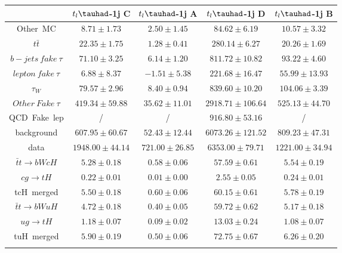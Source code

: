 \centering
\begin{tabular}{ccccc} \toprule\toprule
 & $t_{l}\tauhad$-1j C & $t_{l}\tauhad$-1j A & $t_{l}\tauhad$-1j D & $t_{l}\tauhad$-1j B\\\midrule
Other~MC & $8.71\pm1.73$ & $2.50\pm1.45$ & $84.62\pm6.19$ & $10.57\pm3.32$\\
$t\bar{t}$ & $22.35\pm1.75$ & $1.28\pm0.41$ & $280.14\pm6.27$ & $20.26\pm1.69$\\
$b-jets~fake~\tau$ & $71.10\pm3.25$ & $6.14\pm1.20$ & $811.72\pm10.82$ & $93.22\pm4.60$\\
$lepton~fake~\tau$ & $6.88\pm8.37$ & $-1.51\pm5.38$ & $221.68\pm16.47$ & $55.99\pm13.93$\\
$\tau_{W}$ & $79.57\pm2.96$ & $8.40\pm0.94$ & $839.60\pm10.20$ & $104.06\pm3.39$\\
$Other~Fake~\tau$ & $419.34\pm59.88$ & $35.62\pm11.01$ & $2918.71\pm106.64$ & $525.13\pm44.70$\\
QCD~Fake~lep &  / &  / & $916.80\pm53.16$ &  /\\
background & $607.95\pm60.67$ & $52.43\pm12.44$ & $6073.26\pm121.52$ & $809.23\pm47.31$\\
data & $1948.00\pm44.14$ & $721.00\pm26.85$ & $6353.00\pm79.71$ & $1221.00\pm34.94$\\
$\bar{t}t\to bWcH$ & $5.28\pm0.18$ & $0.58\pm0.06$ & $57.59\pm0.61$ & $5.54\pm0.19$\\
$cg\to tH$ & $0.22\pm0.01$ & $0.01\pm0.00$ & $2.55\pm0.05$ & $0.24\pm0.01$\\
tcH~merged & $5.50\pm0.18$ & $0.60\pm0.06$ & $60.15\pm0.61$ & $5.78\pm0.19$\\
$\bar{t}t\to bWuH$ & $4.72\pm0.18$ & $0.40\pm0.05$ & $59.72\pm0.62$ & $5.17\pm0.18$\\
$ug\to tH$ & $1.18\pm0.07$ & $0.09\pm0.02$ & $13.03\pm0.24$ & $1.08\pm0.07$\\
tuH~merged & $5.90\pm0.19$ & $0.50\pm0.06$ & $72.75\pm0.67$ & $6.26\pm0.20$\\
\bottomrule\bottomrule\\
\end{tabular}
